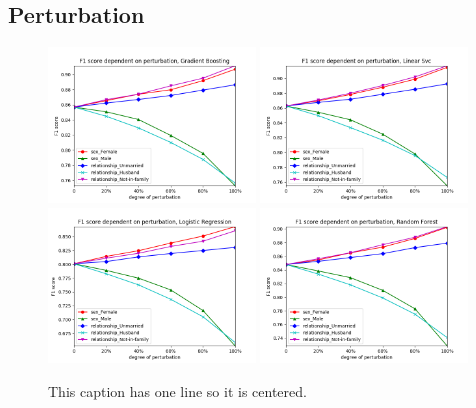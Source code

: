 \documentclass[a4paper,twoside]{article}
\begin{document}
\subsection{Perturbation}

\begin{figure}[h]
	\centering
	\includegraphics[width=0.49\textwidth]{figures/perturbation/adults_marital_status/gradient_boost}
	\includegraphics[width=0.49\textwidth]{figures/perturbation/adults_marital_status/linear_svc}
	\includegraphics[width=0.49\textwidth]{figures/perturbation/adults_marital_status/logistic_regression}
	\includegraphics[width=0.49\textwidth]{figures/perturbation/adults_marital_status/random_forest}
	\caption{This caption has one line so it is centered.}
	\label{fig:results_anonymization_education_num}
\end{figure}
\end{document}
